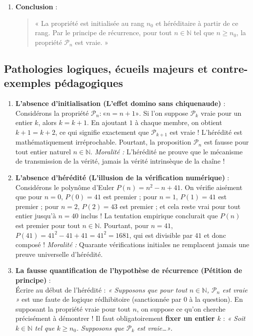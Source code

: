 \documentclass[11pt,a4paper]{article}
\newcommand{\N}{\mathbb{N}}
\begin{document}
\begin{methodebox}
\begin{enumerate}[label=\textbf{\Roman*.}]
    \item \textbf{Conclusion} :
    \begin{quote}
    « La propriété est initialisée au rang $n_0$ et héréditaire à partir de ce rang. Par le principe de récurrence, pour tout $n \in \N$ tel que $n \ge n_0$, la propriété $\mathcal{P}_n$ est vraie. »
    \end{quote}
\end{enumerate}
\end{methodebox}

\subsection{Pathologies logiques, écueils majeurs et contre-exemples pédagogiques}

\begin{warningbox}
\begin{enumerate}
    \item \textbf{L'absence d'initialisation (L'effet domino sans chiquenaude)} :\\
    Considérons la propriété $\mathcal{P}_n : « n = n + 1 »$.
    Si l'on suppose $\mathcal{P}_k$ vraie pour un entier $k$, alors $k = k+1$. En ajoutant $1$ à chaque membre, on obtient $k+1 = k+2$, ce qui signifie exactement que $\mathcal{P}_{k+1}$ est vraie ! L'hérédité est mathématiquement irréprochable. Pourtant, la proposition $\mathcal{P}_n$ est fausse pour tout entier naturel $n \in \N$.
    \textit{Moralité :} L'hérédité ne prouve que le mécanisme de transmission de la vérité, jamais la vérité intrinsèque de la chaîne !

    \item \textbf{L'absence d'hérédité (L'illusion de la vérification numérique)} :\\
    Considérons le polynôme d'Euler $P(n) = n^2 - n + 41$.
    On vérifie aisément que pour $n = 0$, $P(0) = 41$ est premier ; pour $n = 1$, $P(1) = 41$ est premier ; pour $n = 2$, $P(2) = 43$ est premier ; et cela reste vrai pour tout entier jusqu'à $n = 40$ inclus !
    La tentation empirique conclurait que $P(n)$ est premier pour tout $n \in \N$. Pourtant, pour $n = 41$, $P(41) = 41^2 - 41 + 41 = 41^2 = 1681$, qui est divisible par $41$ et donc composé !
    \textit{Moralité :} Quarante vérifications initiales ne remplacent jamais une preuve universelle d'hérédité.

    \item \textbf{La fausse quantification de l'hypothèse de récurrence (Pétition de principe)} :\\
    Écrire au début de l'hérédité : \textit{« Supposons que pour tout $n \in \N$, $\mathcal{P}_n$ est vraie »} est une faute de logique rédhibitoire (sanctionnée par 0 à la question). En supposant la propriété vraie pour tout $n$, on suppose ce qu'on cherche précisément à démontrer !
    Il faut obligatoirement \textbf{fixer un entier $k$} : \textit{« Soit $k \in \N$ tel que $k \ge n_0$. Supposons que $\mathcal{P}_k$ est vraie\dots »}.
\end{enumerate}
\end{warningbox}
\end{document}
